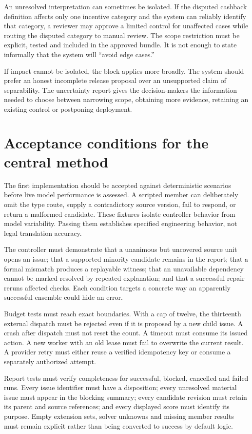 An unresolved interpretation can sometimes be isolated. If the disputed cashback
definition affects only one incentive category and the system can reliably
identify that category, a reviewer may approve a limited control for unaffected
cases while routing the disputed category to manual review. The scope restriction
must be explicit, tested and included in the approved bundle. It is not enough to
state informally that the system will ``avoid edge cases.''

If impact cannot be isolated, the block applies more broadly. The system should
prefer an honest incomplete release proposal over an unsupported claim of
separability. The uncertainty report gives the decision-makers the information
needed to choose between narrowing scope, obtaining more evidence, retaining an
existing control or postponing deployment.

\section{Acceptance conditions for the central method}

The first implementation should be accepted against deterministic scenarios
before live model performance is assessed. A scripted member can deliberately
omit the type route, supply a contradictory source version, fail to respond, or
return a malformed candidate. These fixtures isolate controller behavior from
model variability. Passing them establishes specified engineering behavior, not
legal translation accuracy.

The controller must demonstrate that a unanimous but uncovered source unit opens
an issue; that a supported minority candidate remains in the report; that a
formal mismatch produces a replayable witness; that an unavailable dependency
cannot be marked resolved by repeated explanation; and that a successful repair
reruns affected checks. Each condition targets a concrete way an apparently
successful ensemble could hide an error.

Budget tests must reach exact boundaries. With a cap of twelve, the thirteenth
external dispatch must be rejected even if it is proposed by a new child issue.
A crash after dispatch must not reset the count. A timeout must consume its
issued action. A new worker with an old lease must fail to overwrite the current
result. A provider retry must either reuse a verified idempotency key or consume
a separately authorized attempt.

Report tests must verify completeness for successful, blocked, cancelled and
failed runs. Every issue identifier must have a disposition; every unresolved
material issue must appear in the blocking summary; every candidate revision
must retain its parent and source references; and every displayed score must
identify its purpose. Empty extension sets, solver unknowns and missing member
results must remain explicit rather than being converted to success by default
logic.

